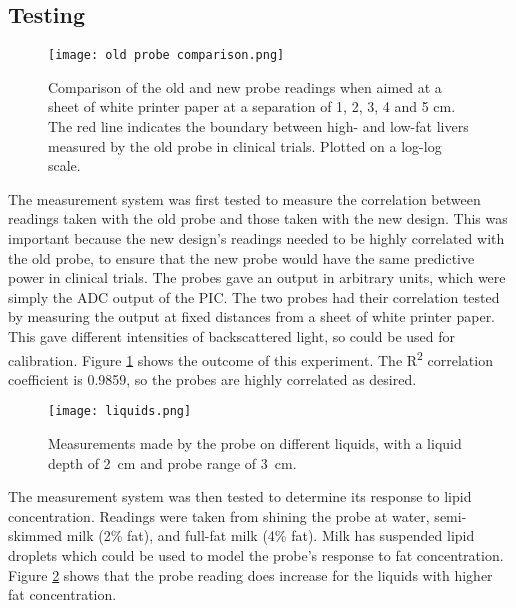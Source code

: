 \subsection{Testing}
\begin{figure}[htb]
	\centering
	\texttt{[image: old probe comparison.png]}
	\caption{Comparison of the old and new probe readings when aimed at a sheet of white printer paper at a separation of 1, 2, 3, 4 and 5 cm. The red line indicates the boundary between high- and low-fat livers measured by the old probe in clinical trials. Plotted on a log-log scale.}
	\label{fig: old probe comparison}
\end{figure}

The measurement system was first tested to measure the correlation between readings taken with the old probe and those taken with the new design. This was important because the new design's readings needed to be highly correlated with the old probe, to ensure that the new probe would have the same predictive power in clinical trials. The probes gave an output in arbitrary units, which were simply the ADC output of the PIC. The two probes had their correlation tested by measuring the output at fixed distances from a sheet of white printer paper. This gave different intensities of backscattered light, so could be used for calibration. Figure \ref{fig: old probe comparison} shows the outcome of this experiment. The R\textsuperscript{2} correlation coefficient is 0.9859, so the probes are highly correlated as desired. \\

\begin{figure}[htb]
	\centering
	\texttt{[image: liquids.png]}
	\caption{Measurements made by the probe on different liquids, with a liquid depth of \SI{2}{\centi\metre} and probe range of \SI{3}{\centi\metre}.}
	\label{fig: liquids}
\end{figure}

The measurement system was then tested to determine its response to lipid concentration. Readings were taken from shining the probe at water, semi-skimmed milk (2\% fat), and full-fat milk (4\% fat). Milk has suspended lipid droplets which could be used to model the probe's response to fat concentration. Figure \ref{fig: liquids} shows that the probe reading does increase for the liquids with higher fat concentration.






